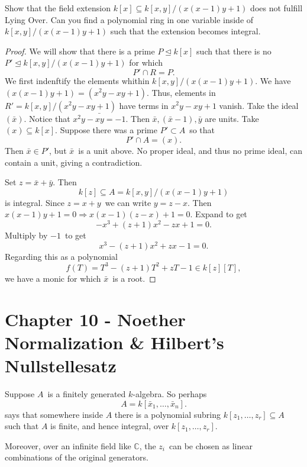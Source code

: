 \documentclass[11pt]{article}
\begin{document}
\begin{prob}
    Show that the field extension 
    $k[x] \subseteq k[x,y]/(x(x-1)y+1)$ 
    does not fulfill Lying Over. Can you find a polynomial 
    ring in one variable inside of $k[x,y]/(x(x-1)y+1)$ 
    such that the extension becomes integral. 
\end{prob}
\begin{proof}
    We will show that there is a prime 
    $P \trianglelefteq k[x]$ such that there is no 
    $P' \trianglelefteq k[x,y]/(x(x-1)y+1)$ for which 
    \[
        P' \cap R = P.
    \]
    We first indenftify the elements whithin 
    $k[x,y]/(x(x-1)y+1)$. 
    We have $(x(x-1)y+1) = (x^2y - xy + 1)$. Thus, 
    elements in $R' = k[x,y]/(x^2y - xy + 1)$ have terms in 
    $x^2y - xy + 1$ vanish. Take the ideal 
    $(\bar x)$. Notice that $\bar{x^2y - xy = -1}$. 
    Then $\bar x, (\bar x -1), \bar y$ are units.
    Take $(x) \subseteq k[x]$. Suppose there was a prime 
    $P' \subset A$ so that 
    \[
        P' \cap A = (x). 
    \]
    Then $\bar x \in P'$, but $\bar x$ is a unit above. 
    No proper ideal, and thus no prime ideal, can contain 
    a unit, giving a contradiction.

    Set $z = \bar x + \bar y$. Then 
    \[
        k[z] \subseteq A = k[x,y]/(x(x-1)y + 1)
    \]
    is integral. Since $z = x +y$ we can write 
    $y = z - x$.
    Then $x(x-1)y + 1=0 \Rightarrow x(x-1)(z-x) + 1 = 0$. 
    Expand to get 
    \[
        -x^3 + (z+1)x^2 - zx + 1 = 0.
    \]
    Multiply by $-1$ to get 
    \[
        x^3 - (z+1)x^2 +zx - 1 = 0. 
    \]
    Regarding this as a polynomial 
    \[
        f(T) = T^3-(z+1)T^2+zT-1\in k[z][T], 
    \]
    we have a monic for which $\bar x$ is a root.
\end{proof}

\section{Chapter 10 - Noether Normalization \& 
Hilbert's Nullstellesatz}

Suppose $A$ is a finitely generated $k$-algebra. 
So perhaps 
\[
    A = k[\bar x_1, \ldots, \bar x_n].
\]
says that somewhere inside $A$ there is 
a polynomial subring $k[z_1,\ldots,z_r] \subseteq A$ 
such that $A$ is finite, and hence integral, over 
$k[z_1,\ldots,z_r]$.

Moreover, over an infinite field like $\mathbb C$, the 
$z_i$ can be chosen as linear combinations of the 
original generators. 
\end{document}
